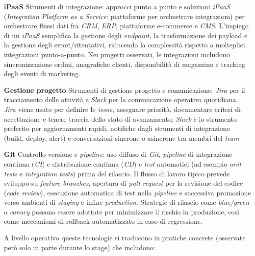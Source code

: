 \medskip
\noindent\textbf{iPaaS}
Strumenti di integrazione: approcci punto a punto e soluzioni \emph{iPaaS} (\emph{Integration Platform as a Service}: piattaforme per orchestrare integrazioni) 
per orchestrare flussi dati fra \emph{CRM}, \emph{ERP}, piattaforme e-commerce e \emph{CMS}. L’impiego di un \emph{iPaaS} semplifica la gestione degli \emph{endpoint}, 
la trasformazione dei payload e la gestione degli errori/ritentativi, riducendo la complessità rispetto a molteplici integrazioni punto-a-punto. Nei progetti osservati, 
le integrazioni includono sincronizzazione ordini, anagrafiche clienti, disponibilità di magazzino e tracking degli eventi di marketing.

\medskip
\noindent\textbf{Gestione progetto}
Strumenti di gestione progetto e comunicazione: \emph{Jira} per il tracciamento delle attività e \emph{Slack} per la comunicazione operativa quotidiana. \emph{Jira} 
viene usato per definire le \emph{issue}, assegnare priorità, documentare criteri di accettazione e tenere traccia dello stato di avanzamento; \emph{Slack} 
è lo strumento preferito per aggiornamenti rapidi, notifiche dagli strumenti di integrazione (build, deploy, alert) e conversazioni sincrone o asincrone tra membri del \emph{team}.

\medskip
\noindent\textbf{Git}
Controllo versione e \emph{pipeline}: uso diffuso di \emph{Git}, \emph{pipeline} di integrazione continua (\emph{CI}) e distribuzione continua (\emph{CD}) e \emph{test} 
automatici (ad esempio \emph{unit tests} e \emph{integration tests}) prima del rilascio. Il flusso di lavoro tipico prevede sviluppo su \emph{feature branches}, 
apertura di \emph{pull request} per la revisione del codice (\emph{code review}), esecuzione automatica di test nella \emph{pipeline} e successiva promozione verso 
ambienti di \emph{staging} e infine \emph{production}. Strategie di rilascio come \emph{blue/green} o \emph{canary} possono essere adottate per minimizzare il 
rischio in produzione, così come meccanismi di rollback automatizzato in caso di regressione.

A livello operativo queste tecnologie si traducono in pratiche concrete (osservate però solo in parte durante lo stage) che includono:

